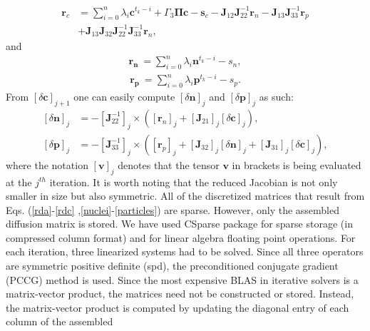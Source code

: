 \documentclass[aps,preprint]{revtex4}
\begin{document}
\begin{align}
\mathbf{r}_{c}  & =\sum_{i=0}^{n}\lambda_{i}\mathbf{c}^{t _{k}-i}+{\Gamma}%
_{3}\mathbf{\Pi c-s}_{c}-\mathbf{J}_{12}\mathbf{J}_{22}^{-1}\mathbf{r}%
_{n}-\mathbf{J}_{13}\mathbf{J}_{33}^{-1}\mathbf{r}_{p}\nonumber\\
& +\mathbf{J}_{13}\mathbf{J}_{32}\mathbf{J}_{22}^{-1}\mathbf{J}_{33}%
^{-1}\mathbf{r}_{n},
\end{align}
and
\begin{align}
\mathbf{r_{n}}\ = \sum_{i=0}^{n}\lambda_{i}\mathbf{n}^{t _{k}-i} - s_{n},
\end{align}
\begin{align}
\mathbf{r_{p}}\ = \sum_{i=0}^{n}\lambda_{i}\mathbf{p}^{t _{k}-i} - s_{p}.
\end{align}
From $\left[  \delta\mathbf{c}\right]  _{j+1}$ one can easily compute $\left[
\delta\mathbf{n}\right]  _{j}$ and $\left[  \delta\mathbf{p}\right]  _{j}$ as
such:%
\begin{align}
\left[  \delta\mathbf{n}\right]  _{j}  & = - \left[  \mathbf{J}_{22}%
^{-1}\right]  _{j}\times\left(  \left[  \mathbf{r}_{n}\right]  _{j}+\left[
\mathbf{J}_{21}\right]  _{j}\left[  \delta\mathbf{c}\right]  _{j}\right)  ,\\
\left[  \delta\mathbf{p}\right]  _{j}  & = - \left[  \mathbf{J}_{33}%
^{-1}\right]  _{j}\times\left(  \left[  \mathbf{r}_{p}\right]  _{j}+\left[
\mathbf{J}_{32}\right]  _{j}\left[  \delta\mathbf{n}\right]  _{j}+\left[
\mathbf{J}_{31}\right]  _{j}\left[  \delta\mathbf{c}\right]  _{j}\right)  ,
\end{align}
where the notation $[\mathbf{v}]_{j}$ denotes that the tensor $\mathbf{v}$ in
brackets is being evaluated at the $j^{th}$ iteration. It is worth noting that
the reduced Jacobian is not only smaller in size but also symmetric. All of
the discretized matrices that result from Eqs. (\ref{rda}-\ref{rdc}%
,\ref{nuclei}-\ref{particles}) are sparse. However, only the assembled
diffusion matrix is stored. We have used CSparse \cite{sparse} package for
sparse storage (in compressed column format) and for linear algebra floating
point operations. For each iteration, three linearized systems had to be
solved. Since all three operators are symmetric positive definite (spd), the
preconditioned conjugate gradient (PCCG) method \cite{Saad} is used. Since the
most expensive BLAS in iterative solvers is a matrix-vector product, the
matrices need not be constructed or stored. Instead, the matrix-vector product
is computed by updating the diagonal entry of each column of the assembled
\end{document}
